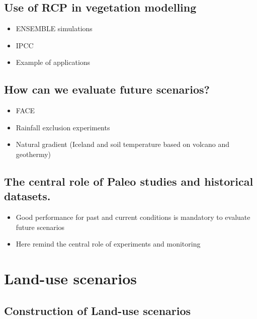 \documentclass[oneside]{book}
\providecommand{\tightlist}{%
  \setlength{\itemsep}{0pt}\setlength{\parskip}{0pt}}
\begin{document}
\subsection{Use of RCP in vegetation
modelling}\label{use-of-rcp-in-vegetation-modelling}

\begin{itemize}
\tightlist
\item
  ENSEMBLE simulations
\item
  IPCC
\item
  Example of applications
\end{itemize}

\subsection{How can we evaluate future
scenarios?}\label{how-can-we-evaluate-future-scenarios}

\begin{itemize}
\tightlist
\item
  FACE
\item
  Rainfall exclusion experiments
\item
  Natural gradient (Iceland and soil temperature based on volcano and
  geothermy)
\end{itemize}

\subsection{The central role of Paleo studies and historical
datasets.}\label{the-central-role-of-paleo-studies-and-historical-datasets.}

\begin{itemize}
\tightlist
\item
  Good performance for past and current conditions is mandatory to
  evaluate future scenarios
\item
  Here remind the central role of experiments and monitoring
\end{itemize}

\section{Land-use scenarios}\label{land-use-scenarios}

\subsection{Construction of Land-use
scenarios}\label{construction-of-land-use-scenarios}
\end{document}
